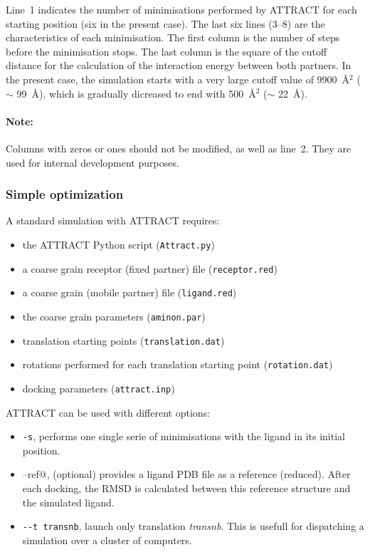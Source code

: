 \documentclass[12pt,a4paper]{article}
\begin{document}
Line~1 indicates the number of minimisations performed by ATTRACT
for each starting position (six in the present case). The last six lines (3--8) 
are the characteristics of
each minimisation. The first column is the number of steps before the
minimisation stops.  The last column is the square of the cutoff distance
for the calculation of the interaction energy between both partners. 
In the present case, the simulation starts with a very large cutoff value of 9900~\AA$^2$ 
($\sim$ 99~\AA), which is gradually dicreased
to end with 500~\AA$^2$ ($\sim$ 22~\AA).

\paragraph{Note:} Columns with zeros or ones should not be modified, as
well as line~2. They are used for internal development purposes.

\subsubsection{Simple optimization}

A standard simulation with ATTRACT requires:
\begin{itemize}
\item the ATTRACT Python script ({\tt  Attract.py})
\item a coarse grain receptor (fixed partner) file ({\tt receptor.red})
\item a coarse grain (mobile partner) file ({\tt ligand.red})
\item the coarse grain parameters ({\tt aminon.par})
\item translation starting points ({\tt translation.dat})
\item rotations performed for each translation starting point ({\tt rotation.dat})
\item docking parameters ({\tt attract.inp})
\end{itemize}

ATTRACT can be used with different options:
\begin{itemize}
\item {\tt -s}, performs one single serie of minimisations with the ligand in its initial position.
\item \verb@--ref@, (optional) provides a ligand PDB file as a reference (reduced). After each docking, the RMSD is calculated between this reference structure and the simulated ligand.
\item \verb!--t transnb!, launch only translation \textit{transnb}. This is usefull for dispatching a simulation over a cluster of computers.
\end{itemize}
\end{document}
